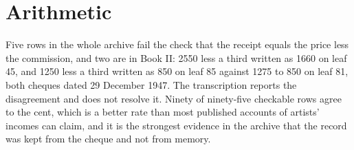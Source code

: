 \section{Arithmetic}

Five rows in the whole archive fail the check that the receipt equals the price less the commission, and two are in Book II: 2550 less a third written as 1660 on leaf 45, and 1250 less a third written as 850 on leaf 85 against 1275 to 850 on leaf 81, both cheques dated 29 December 1947. The transcription reports the disagreement and does not resolve it. Ninety of ninety-five checkable rows agree to the cent, which is a better rate than most published accounts of artists' incomes can claim, and it is the strongest evidence in the archive that the record was kept from the cheque and not from memory.
